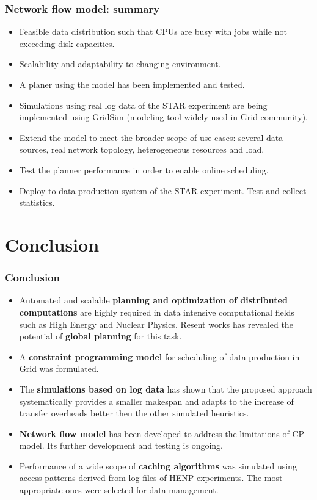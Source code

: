 \documentclass{beamer}
\begin{document}
\begin{frame}\frametitle{Network flow model: summary}
\begin{small}
\begin{block}{}
\begin{itemize}
\item Feasible data distribution such that CPUs are busy with jobs while not exceeding disk capacities.
\item Scalability and adaptability to changing environment.
\item A planer using the model has been implemented and tested.
\item Simulations using real log data of the STAR experiment are being implemented using GridSim (modeling tool widely used in Grid community).   
\item Extend the model to meet the broader scope of use cases: several data sources, real network topology, heterogeneous resources and load.  
\item Test the planner performance in order to enable online scheduling. 
\item Deploy to data production system of the STAR experiment. Test and collect statistics.
\end{itemize}
\end{block}
\end{small}
\end{frame}


\section{Conclusion}

\begin{frame}\frametitle{Conclusion}
\begin{block}{}
\begin{itemize}
\item Automated and scalable \textbf{planning and optimization of distributed computations} are highly required in data intensive computational fields such as High Energy and Nuclear Physics. Resent works has revealed the potential of \textbf{global planning} for this task.
\item A \textbf{constraint programming model} for scheduling of data production in Grid was formulated. 
\item The \textbf{simulations based on log data} has shown that the proposed approach systematically provides a smaller makespan and adapts to the increase of transfer overheads better then the other simulated  heuristics.
\item \textbf{Network flow model} has been developed to address the limitations of CP model. Its further development and testing is ongoing.
\item Performance of a wide scope of \textbf{caching algorithms} was simulated using access patterns derived from log files of HENP experiments. The most appropriate ones were selected for data management. 
\end{itemize}
\end{block}
\end{frame}
\end{document}
